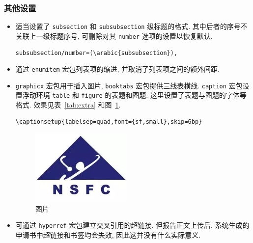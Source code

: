 \documentclass{article}
\begin{document}
\subsubsection{其他设置}

\begin{itemize}
  \item
    适当设置了 \verb'subsection' 和 \verb'subsubsection' 级标题的格式.
    其中后者的序号不关联上一级标题序号,
    可删除对其 \verb'number' 选项的设置以恢复默认.
\begin{verbatim}
subsubsection/number=(\arabic{subsubsection}),
\end{verbatim}
  \item
    通过 \verb'enumitem' 宏包列表项的缩进, 并取消了列表项之间的额外间距.
  \item
    \verb'graphicx' 宏包用于插入图片, \verb'booktabs' 宏包提供三线表横线.
    \verb'caption' 宏包设置浮动环境 \verb'table' 和 \verb'figure' 的表题和图题.
    这里设置了表题与图题的字体等格式.
    效果见表~\ref{tab:extra} 和图~\ref{fig:logo}.
\begin{verbatim}
\captionsetup{labelsep=quad,font={sf,small},skip=6bp}
\end{verbatim}
    \begin{figure}[htbp!]
      \centering
      \includegraphics[height=10em]{logo.jpg}
      \caption{图片}
      \label{fig:logo}
    \end{figure}
  \item
    可通过 \verb'hyperref' 宏包建立交叉引用的超链接.
    但报告正文上传后, 系统生成的申请书中超链接和书签均会失效,
    因此这并没有什么实际意义.
\end{itemize}




%
%
\end{document}
